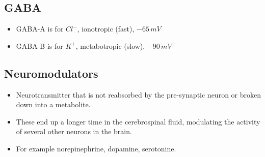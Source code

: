\documentclass[main]{subfiles}
\begin{document}
\subsection{GABA}
\begin{itemize}[noitemsep,nolistsep]
	\item GABA-A is for $Cl^-$, ionotropic (fast), $-65\,mV$
	\item GABA-B is for $K^+$, metabotropic (slow), $-90\,mV$
\end{itemize}

\subsection{Neuromodulators}
\begin{itemize}[noitemsep,nolistsep]
	\item Neurotransmitter that is not reabsorbed by the pre-synaptic neuron or broken down into a metabolite.
	\item These end up a longer time in the cerebrospinal fluid, modulating the activity of several other neurons in the brain.
	\item For example norepinephrine, dopamine, serotonine.
\end{itemize}
\end{document}
